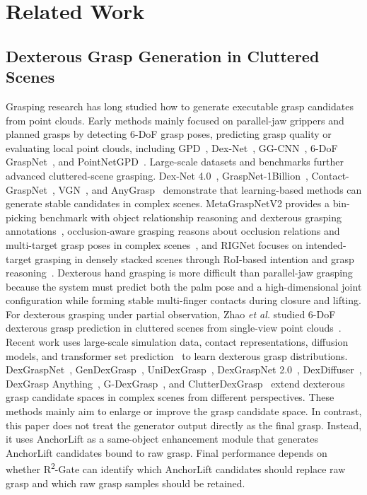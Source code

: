 \documentclass[lettersize,journal]{IEEEtran}
\begin{document}
\section{Related Work}

\subsection{Dexterous Grasp Generation in Cluttered Scenes}

Grasping research has long studied how to generate executable grasp candidates from point clouds. Early methods mainly focused on parallel-jaw grippers and planned grasps by detecting 6-DoF grasp poses, predicting grasp quality or evaluating local point clouds, including GPD~\cite{ref5}, Dex-Net~\cite{ref6}, GG-CNN~\cite{ref7}, 6-DoF GraspNet~\cite{ref8}, and PointNetGPD~\cite{ref9}. Large-scale datasets and benchmarks further advanced cluttered-scene grasping. Dex-Net 4.0~\cite{ref10}, GraspNet-1Billion~\cite{ref11}, Contact-GraspNet~\cite{ref12}, VGN~\cite{ref13}, and AnyGrasp~\cite{ref14} demonstrate that learning-based methods can generate stable candidates in complex scenes. MetaGraspNetV2 provides a bin-picking benchmark with object relationship reasoning and dexterous grasping annotations~\cite{ref15}, occlusion-aware grasping reasons about occlusion relations and multi-target grasp poses in complex scenes~\cite{ref16}, and RIGNet focuses on intended-target grasping in densely stacked scenes through RoI-based intention and grasp reasoning~\cite{ref17}. Dexterous hand grasping is more difficult than parallel-jaw grasping because the system must predict both the palm pose and a high-dimensional joint configuration while forming stable multi-finger contacts during closure and lifting. For dexterous grasping under partial observation, Zhao \emph{et al.} studied 6-DoF dexterous grasp prediction in cluttered scenes from single-view point clouds~\cite{ref18}. Recent work uses large-scale simulation data, contact representations, diffusion models, and transformer set prediction~\cite{ref19} to learn dexterous grasp distributions. DexGraspNet~\cite{ref20}, GenDexGrasp~\cite{ref21}, UniDexGrasp~\cite{ref22}, DexGraspNet 2.0~\cite{ref23}, DexDiffuser~\cite{ref24}, DexGrasp Anything~\cite{ref25}, G-DexGrasp~\cite{ref26}, and ClutterDexGrasp~\cite{ref27} extend dexterous grasp candidate spaces in complex scenes from different perspectives. These methods mainly aim to enlarge or improve the grasp candidate space. In contrast, this paper does not treat the generator output directly as the final grasp. Instead, it uses AnchorLift as a same-object enhancement module that generates AnchorLift candidates bound to raw grasp. Final performance depends on whether R\textsuperscript{2}-Gate can identify which AnchorLift candidates should replace raw grasp and which raw grasp samples should be retained.
\end{document}
